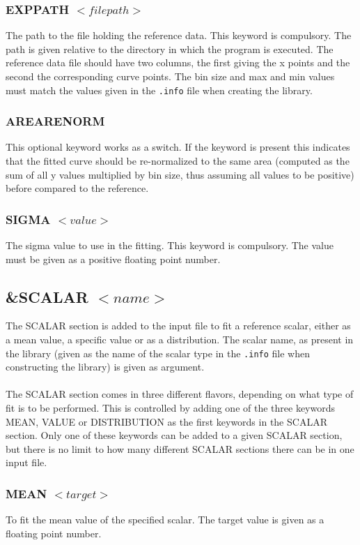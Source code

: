 \documentclass[a4paper, 10pt]{article}
\begin{document}
\subsubsection{EXPPATH $<file path>$}
The path to the file holding the reference data. This
keyword is compulsory. The path is given
relative to the directory in which the program is executed.
The reference data file should have two columns, the first giving the
x points and the second the corresponding curve points.
The bin size and max and min values must
match the values given in the {\tt .info} file when creating the library.

\subsubsection{AREARENORM}
This optional keyword works as a switch. If the keyword is present
this indicates that the
fitted curve should be re-normalized to the same area
(computed as the sum of all y values multiplied by bin size,
thus assuming all values to be positive)
before compared to the reference.

\subsubsection{SIGMA $<value>$}
The sigma value to use in the fitting. This keyword is compulsory. The
value must be given as a positive floating point number.

\subsection{\&SCALAR $<name>$}
The SCALAR section is added to the input file to fit a reference
scalar, either as a mean value, a specific value or as a distribution.
The scalar name, as present in the library (given as the name
of the scalar type in the {\tt .info} file when constructing the
library) is given as argument.
\\\\
The SCALAR section comes in three different flavors, depending on what
type of fit is to be performed. This is controlled by adding one of
the three keywords MEAN, VALUE or DISTRIBUTION as the first keywords in
the SCALAR section. Only one of these keywords can be added to a
given SCALAR section, but there is no limit to how many different SCALAR
sections there can be in one input file.

\subsubsection{MEAN $<target>$}
To fit the mean value of the specified scalar. The target value is
given as a floating point number.
\end{document}
